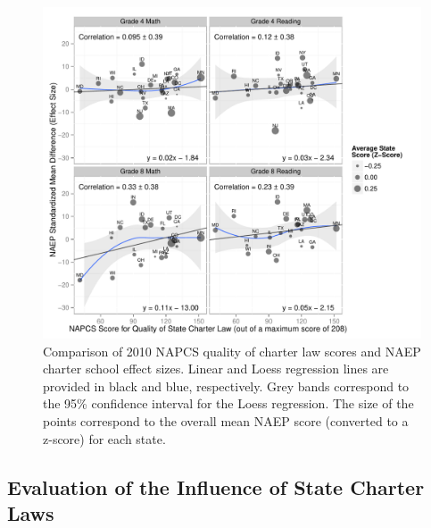 \documentclass[letterpaper,12p,twoside]{article} %
\begin{document}
\setlength{\belowcaptionskip}{-16pt}
\begin{figure}[t!]
\begin{center}
\includegraphics[width=\textwidth, trim=0 .1in 0 .2in]{../Figures2009/LawScoresVsNAEPDifferences.pdf}
\caption[Comparison of 2010 NAPCS quality of charter law scores and NAEP charter school effect sizes]{Comparison of 2010 NAPCS quality of charter law scores and NAEP charter school effect sizes. Linear and Loess regression lines are provided in black and blue, respectively. Grey bands correspond to the 95\% confidence interval for the Loess regression. The size of the points correspond to the overall mean NAEP score (converted to a z-score) for each state.}
\label{fig:staterankings}
\end{center}
\end{figure}
\setlength{\belowcaptionskip}{0pt}


\subsection{Evaluation of the Influence of State Charter Laws}


\end{document}
